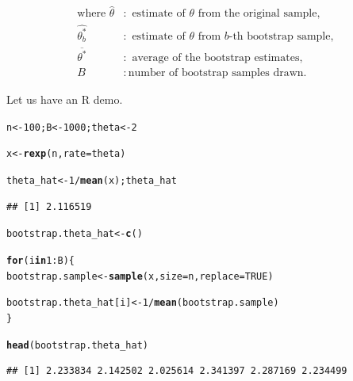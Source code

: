 \documentclass[11pt, a4paper]{article}\usepackage[]{graphicx}\usepackage[]{xcolor}
\makeatletter
\newcommand{\hlnum}[1]{\textcolor[rgb]{0.686,0.059,0.569}{#1}}%
\newcommand{\hlopt}[1]{\textcolor[rgb]{0,0,0}{#1}}%
\newcommand{\hldef}[1]{\textcolor[rgb]{0.345,0.345,0.345}{#1}}%
\newcommand{\hlkwa}[1]{\textcolor[rgb]{0.161,0.373,0.58}{\textbf{#1}}}%
\newcommand{\hlkwb}[1]{\textcolor[rgb]{0.69,0.353,0.396}{#1}}%
\newcommand{\hlkwc}[1]{\textcolor[rgb]{0.333,0.667,0.333}{#1}}%
\newcommand{\hlkwd}[1]{\textcolor[rgb]{0.737,0.353,0.396}{\textbf{#1}}}%
\newenvironment{kframe}{%
 \def\at@end@of@kframe{}%
 \ifinner\ifhmode%
  \def\at@end@of@kframe{\end{minipage}}%
  \begin{minipage}{\columnwidth}%
 \fi\fi%
 \def\FrameCommand##1{\hskip\@totalleftmargin \hskip-\fboxsep
 \colorbox{shadecolor}{##1}\hskip-\fboxsep
     \hskip-\linewidth \hskip-\@totalleftmargin \hskip\columnwidth}%
 \MakeFramed {\advance\hsize-\width
   \@totalleftmargin\z@ \linewidth\hsize
   \@setminipage}}%
 {\par\unskip\endMakeFramed%
 \at@end@of@kframe}
\newenvironment{knitrout}{}{} %
\makeatother
\begin{document}
\begin{align*}
\text{where } \hat{\theta} &: \text{ estimate of } \theta \text{ from the original sample}, \\[0.2em]
\widehat{\theta_{b}^{*}} &: \text{ estimate of } \theta \text{ from } b\text{-th bootstrap sample}, \\[0.2em]
\overline{\theta^*} &: \text{ average of the bootstrap estimates}, \\[0.2em]
B &: \text{number of bootstrap samples drawn}.
\end{align*}

Let us have an R demo.





\begin{knitrout}
\color{fgcolor}\begin{kframe}
\begin{alltt}
\hldef{n} \hlkwb{<-} \hlnum{100}\hldef{; B} \hlkwb{<-} \hlnum{1000}\hldef{; theta} \hlkwb{<-} \hlnum{2}

\hldef{x} \hlkwb{<-} \hlkwd{rexp}\hldef{(n,} \hlkwc{rate} \hldef{= theta)}

\hldef{theta_hat} \hlkwb{<-} \hlnum{1} \hlopt{/} \hlkwd{mean}\hldef{(x); theta_hat}
\end{alltt}
\begin{verbatim}
## [1] 2.116519
\end{verbatim}
\end{kframe}
\end{knitrout}

\begin{knitrout}
\color{fgcolor}\begin{kframe}
\begin{alltt}
\hldef{bootstrap.theta_hat} \hlkwb{<-} \hlkwd{c}\hldef{()}

\hlkwa{for} \hldef{(i} \hlkwa{in} \hlnum{1}\hlopt{:}\hldef{B) \{}
  \hldef{bootstrap.sample} \hlkwb{<-} \hlkwd{sample}\hldef{(x,} \hlkwc{size} \hldef{= n,} \hlkwc{replace} \hldef{=} \hlnum{TRUE}\hldef{)}

  \hldef{bootstrap.theta_hat[i]} \hlkwb{<-} \hlnum{1} \hlopt{/} \hlkwd{mean}\hldef{(bootstrap.sample)}
\hldef{\}}

\hlkwd{head}\hldef{(bootstrap.theta_hat)}
\end{alltt}
\begin{verbatim}
## [1] 2.233834 2.142502 2.025614 2.341397 2.287169 2.234499
\end{verbatim}
\end{kframe}
\end{knitrout}
\end{document}
